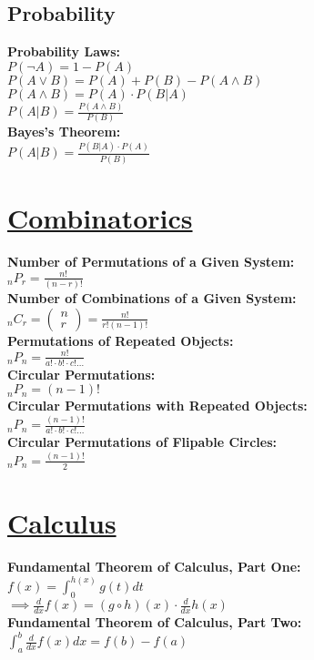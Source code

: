 \documentclass[12pt]{article}
\begin{document}
\subsection*{Probability}
\textbf{Probability Laws:}
    \\ \( P( \lnot A ) = 1 - P( A ) \)
    \\ \( P( A \lor B ) = P( A ) + P( B ) - P( A \land B ) \)
    \\ \( P( A \land B ) = P( A ) \cdot P( B | A ) \)
    \\ \( P( A | B ) = \displaystyle\frac{ P( A \land B ) }{ P( B ) } \)
\\ \textbf{Bayes's Theorem:}
    \\ \( P( A | B ) = \displaystyle\frac{ P( B | A ) \cdot P( A ) }{ P( B ) } \)



\section*{\underline{Combinatorics}}
\textbf{Number of Permutations of a Given System:}
    \\ \( _nP_r = \displaystyle\frac{ n! }{ ( n - r )! } \)
\\ \textbf{Number of Combinations of a Given System:}
    \\ \( _nC_r = \left( \displaystyle\substack{ n \\ r } \right) = \displaystyle\frac{ n! }{ r! ( n - 1 )! } \)
\\ \textbf{Permutations of Repeated Objects:}
    \\ \( _nP_n = \displaystyle\frac{ n! }{ a! \cdot b! \cdot c! ... } \)
\\ \textbf{Circular Permutations:}
    \\ \( _nP_n = ( n - 1 )! \)
\\ \textbf{Circular Permutations with Repeated Objects:}
    \\ \( _nP_n = \displaystyle\frac{ ( n - 1 )! }{ a! \cdot b! \cdot c! ... } \)
\\ \textbf{Circular Permutations of Flipable Circles:}
    \\ \( _nP_n = \displaystyle\frac{ ( n - 1 )! }{ 2 } \)



\section*{\underline{Calculus}}
\textbf{Fundamental Theorem of Calculus, Part One:}
    \\ \( f( x ) = \displaystyle\int_{0}^{h( x )} { g( t ) dt } \)
    \\ \( \implies \displaystyle\frac{ d }{ dx } f( x ) = ( g \circ h )( x ) \cdot \displaystyle\frac{ d }{ dx } h( x ) \)
\\ \textbf{Fundamental Theorem of Calculus, Part Two:}
    \\ \( \displaystyle\int_{a}^{b} { \displaystyle\frac{ d }{ dx } f( x ) dx } = f( b ) - f( a ) \)
\end{document}
